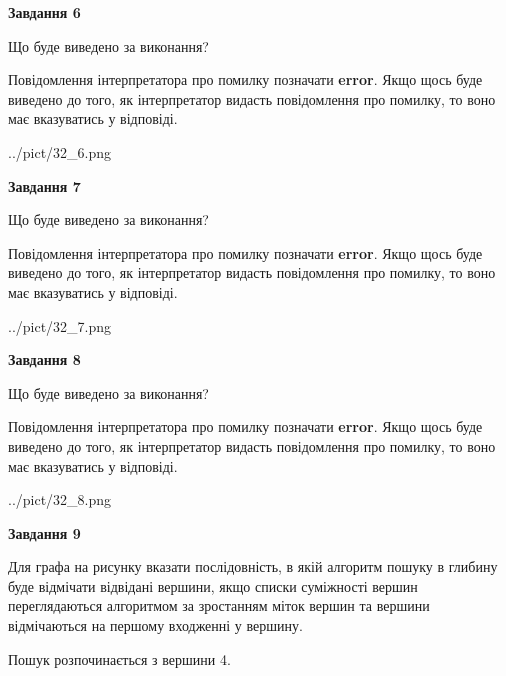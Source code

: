 \documentclass[12pt, ukrainian]{article}
\begin{document}
{\begin {large}
{\begin {center}\textbf{Завдання 6}\end {center}}\par
Що буде виведено за виконання?

Повідомлення інтерпретатора про помилку позначати \textbf{error}.
Якщо щось буде виведено до того, як інтерпретатор видасть повідомлення про помилку, 
то воно має вказуватись у відповіді. \par


\begin{center}
	{../pict/32_6.png}
\end{center}
\newpage

{\begin {center}\textbf{Завдання 7}\end {center}}\par
Що буде виведено за виконання?

Повідомлення інтерпретатора про помилку позначати \textbf{error}.
Якщо щось буде виведено до того, як інтерпретатор видасть повідомлення про помилку, 
то воно має вказуватись у відповіді. \par


\begin{center}
	{../pict/32_7.png}
\end{center}
\newpage

{\begin {center}\textbf{Завдання 8}\end {center}}\par
Що буде виведено за виконання?

Повідомлення інтерпретатора про помилку позначати \textbf{error}.
Якщо щось буде виведено до того, як інтерпретатор видасть повідомлення про помилку, 
то воно має вказуватись у відповіді. \par


\begin{center}
	{../pict/32_8.png}
\end{center}
\newpage

{\begin {center}\textbf{Завдання 9}\end {center}}\par
Для графа на рисунку вказати послідовність, в якій алгоритм пошуку в глибину буде відмічати відвідані вершини, якщо списки суміжності вершин переглядаються алгоритмом за зростанням міток вершин та вершини відмічаються на першому вход\-женні у вершину.\par
Пошук розпочинається з вершини 4.\par


\end{large}}
\end{document}
